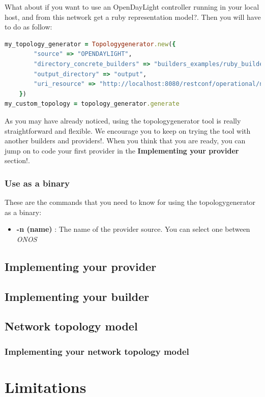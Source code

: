 What about if you want to use an OpenDayLight controller running in your local host, and from this network get a ruby representation model?. Then you will have to do as follow:

\begin{lstlisting}[language=Ruby]
my_topology_generator = Topologygenerator.new({
        "source" => "OPENDAYLIGHT",
        "directory_concrete_builders" => "builders_examples/ruby_builders",
        "output_directory" => "output",
        "uri_resource" => "http://localhost:8080/restconf/operational/network-topology:network-topology/topology/flow:1/" 
    }) 
my_custom_topology = topology_generator.generate
\end{lstlisting}

As you may have already noticed, using the topologygenerator tool is really straightforward and flexible. We encourage you to keep on trying the tool with another builders and providers!. When you think that you are ready, you can jump on to code your first provider in the \textbf{Implementing your provider} section!.

\subsubsection{Use as a binary}

These are the commands that you need to know for using the topologygenerator as a binary:

\begin{itemize}
\item \textbf{-n (name)} : The name of the provider source. You can select one between \textit{ONOS}

\end{itemize}

\subsection{Implementing your provider}

\subsection{Implementing your builder}

\subsection{Network topology model}

\subsubsection{Implementing your network topology model}



\section{Limitations}